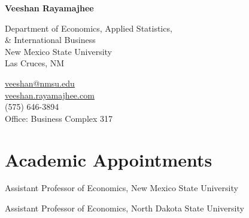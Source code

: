 \documentclass[12pt,letterpaper]{report}
\newcommand{\myname}{Veeshan Rayamajhee}
\newcommand{\namefont}[1]{{\normalfont\bfseries\Huge{#1}}}
\begin{document}
    \raggedright
    \thispagestyle{empty}

    \namefont{\myname}

    \vspace{1em}
    \begin{minipage}[t]{0.63\textwidth}
        Department of Economics, Applied Statistics, \\
        \& International Business \\
        New Mexico State University \\
        Las Cruces, NM
    \end{minipage}
    \begin{minipage}[t]{0.36\textwidth}
        \Email \hspace{5pt}\href{mailto:veeshan@nmsu.edu}{veeshan@nmsu.edu} \\
        \Mundus \hspace{3pt} \href{https://veeshan.rayamajhee.com/}{veeshan.rayamajhee.com} \\
        \Telefon \hspace{5pt} (575) 646-3894 \\
        Office: Business Complex 317
    \end{minipage}
    \vspace{0em} %

\vspace{15pt}
    \section*{Academic Appointments}
    \begin{tablist}

         \item[2024--\textit{present}] \tab Assistant Professor of Economics, New Mexico State University
         \item[2019-2024] \tab Assistant Professor of Economics, North Dakota State University

    \end{tablist}
\end{document}
